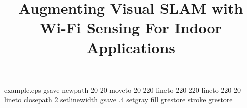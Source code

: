 %
%
%
%
%
\begin{filecontents*}{example.eps}
gsave
newpath
  20 20 moveto
  20 220 lineto
  220 220 lineto
  220 20 lineto
closepath
2 setlinewidth
gsave
  .4 setgray fill
grestore
stroke
grestore
\end{filecontents*}
%
\RequirePackage{fix-cm}
%
\documentclass[twocolumn]{svjour3}          %
%
\smartqed  %
%
\usepackage{graphicx}
\usepackage{apalike}
\usepackage{setspace}
\usepackage{booktabs} %
\usepackage{pdfpages}
\graphicspath{{images/}}
\usepackage{color}
\usepackage{wrapfig}
\usepackage{hyperref}
\usepackage{epstopdf}
\usepackage{subcaption}
\usepackage{array}
\usepackage{balance}
\usepackage{gensymb}
\usepackage{mathpazo}
\usepackage{amsmath}

\newcommand{\zaki}[1] {{\color{red} #1} }

%
%
%
%
%


\title{Augmenting Visual SLAM with Wi-Fi Sensing For Indoor Applications%
}

